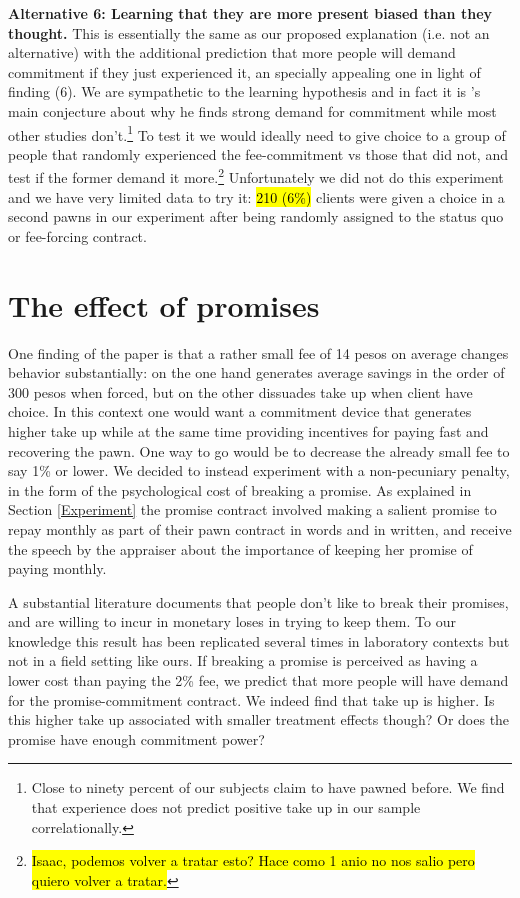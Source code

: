 \documentclass[11pt]{article}
\begin{document}
\vspace{.1in}
\noindent \textbf{Alternative 6: Learning that they are more present biased than they thought.} This is essentially the same as our proposed explanation (i.e. not an alternative) with the additional prediction that more people will demand commitment if they just experienced it, an specially appealing one in light of finding (6). We are sympathetic to the learning hypothesis and in fact it is \cite{Alcohol}'s main conjecture about why he finds strong demand for commitment while most other studies don't.\footnote{Close to ninety percent of our subjects claim to have pawned before. We find that experience does not predict positive take up in our sample correlationally.} To test it we would ideally need to give choice to a group of people that randomly experienced the fee-commitment vs those that did not, and test if the former demand it more.\footnote{\hl{Isaac, podemos volver a tratar esto? Hace como 1 anio no nos salio pero quiero volver a tratar.}} Unfortunately we did not do this experiment and we have very limited data to try it: \hl{210 (6\%)} clients were given a choice in a second pawns in our experiment after being randomly assigned to the status quo or fee-forcing contract. 


\section{The effect of promises} \label{promises}

One finding of the paper is that a rather small fee of 14 pesos on average changes behavior substantially: on the one hand generates average savings in the order of 300 pesos when forced, but on the other dissuades take up  when client have choice. In this context one would want a commitment device that generates higher take up while at the same time providing incentives for paying fast and recovering the pawn. One way to go would be to decrease the already small fee to say 1\% or lower. We decided to instead experiment with a non-pecuniary penalty, in the form of the psychological cost of breaking a promise. As explained in Section \ref{Experiment} the promise contract involved making a salient promise to repay monthly as part of their pawn contract in words and in written, and receive the speech by the appraiser about the importance of keeping her promise of paying monthly.

A substantial literature documents that people don't like to break their promises, and are willing to incur in monetary loses in trying to keep them. To our knowledge this result has been replicated several times in laboratory contexts but not in a field setting like ours. If breaking a promise is perceived as having a lower cost than paying the 2\% fee, we predict that more people will have demand for the promise-commitment contract. We indeed find that take up is higher. Is this higher take up associated with smaller treatment effects though? Or does the promise have enough commitment power?  
\end{document}
